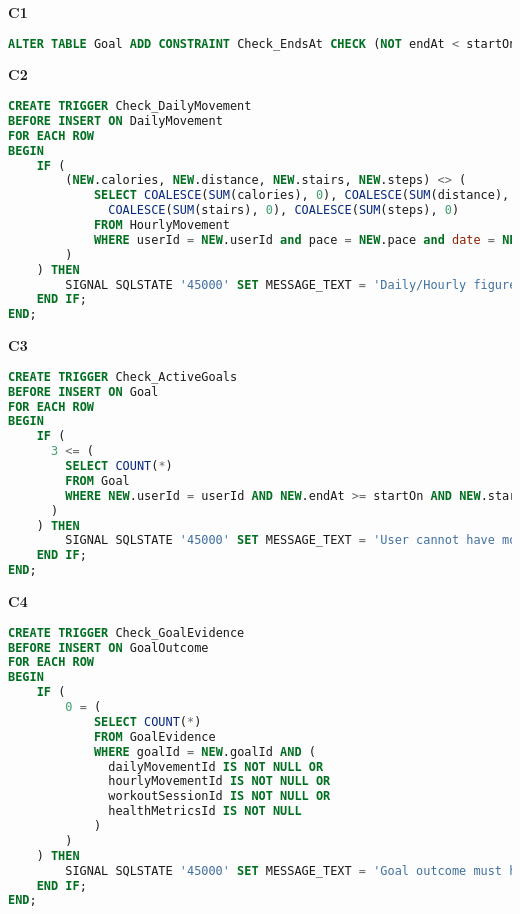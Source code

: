 \documentclass{article}
\begin{document}
\textbf{\small{C1}}
\begin{lstlisting}[language=sql]
ALTER TABLE Goal ADD CONSTRAINT Check_EndsAt CHECK (NOT endAt < startOn);
\end{lstlisting}
\textbf{\small{C2}}
\begin{lstlisting}[language=sql]
CREATE TRIGGER Check_DailyMovement
BEFORE INSERT ON DailyMovement
FOR EACH ROW
BEGIN
    IF (
        (NEW.calories, NEW.distance, NEW.stairs, NEW.steps) <> (
            SELECT COALESCE(SUM(calories), 0), COALESCE(SUM(distance), 0), 
              COALESCE(SUM(stairs), 0), COALESCE(SUM(steps), 0) 
            FROM HourlyMovement
            WHERE userId = NEW.userId and pace = NEW.pace and date = NEW.date
        )
    ) THEN
        SIGNAL SQLSTATE '45000' SET MESSAGE_TEXT = 'Daily/Hourly figures are not consistent';
    END IF;
END;
\end{lstlisting}
\textbf{\small{C3}}
\begin{lstlisting}[language=sql]
CREATE TRIGGER Check_ActiveGoals
BEFORE INSERT ON Goal
FOR EACH ROW
BEGIN
    IF (
      3 <= (
        SELECT COUNT(*) 
        FROM Goal 
        WHERE NEW.userId = userId AND NEW.endAt >= startOn AND NEW.startOn <= endAt
      ) 
    ) THEN
        SIGNAL SQLSTATE '45000' SET MESSAGE_TEXT = 'User cannot have more than 3 active goals';
    END IF;
END;
\end{lstlisting}
\textbf{\small{C4}}
\begin{lstlisting}[language=sql]
CREATE TRIGGER Check_GoalEvidence
BEFORE INSERT ON GoalOutcome
FOR EACH ROW
BEGIN
    IF (  
        0 = (
            SELECT COUNT(*) 
            FROM GoalEvidence 
            WHERE goalId = NEW.goalId AND (
              dailyMovementId IS NOT NULL OR 
              hourlyMovementId IS NOT NULL OR 
              workoutSessionId IS NOT NULL OR 
              healthMetricsId IS NOT NULL
            )
        )
    ) THEN
        SIGNAL SQLSTATE '45000' SET MESSAGE_TEXT = 'Goal outcome must have evidence';
    END IF;
END;
\end{lstlisting}

\pagebreak 
\end{document}
